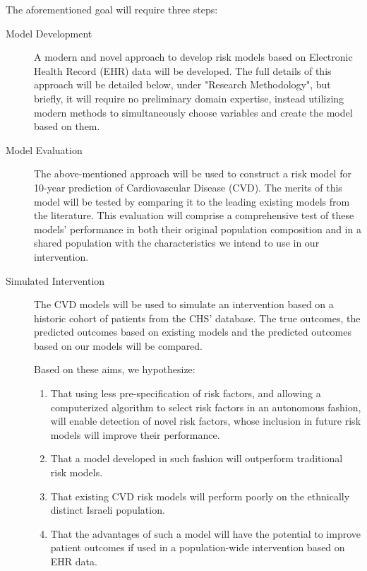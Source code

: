\documentclass[a4paper,12pt]{article}
\begin{document}
	The aforementioned goal will require three steps:
	\begin{description}
		
		\item[Model Development] A modern and novel approach to develop risk models based on Electronic Health Record (EHR) data will be developed. The full details of this approach will be detailed below, under "Research Methodology", but briefly, it will require no preliminary domain expertise, instead utilizing modern methods to simultaneously choose variables and create the model based on them.
		
		\item[Model Evaluation] The above-mentioned approach will be used to construct a risk model for 10-year prediction of Cardiovascular Disease (CVD). The merits of this model will be tested by comparing it to the leading existing models from the literature. This evaluation will comprise a comprehensive test of these models' performance in both their original population composition and in a shared population with the characteristics we intend to use in our intervention.
		
		\item[Simulated Intervention] The CVD models will be used to simulate an intervention based on a historic cohort of patients from the CHS' database. The true outcomes, the predicted outcomes based on existing models and the predicted outcomes based on our models will be compared.
		
		Based on these aims, we hypothesize:
		\begin{enumerate}
			
			\item That using less pre-specification of risk factors, and allowing a computerized algorithm to select risk factors in an autonomous fashion, will enable detection of novel risk factors, whose inclusion in future risk models will improve their performance.
			
			\item That a model developed in such fashion will outperform traditional risk models.
			
			\item That existing CVD risk models will perform poorly on the ethnically distinct Israeli population.
			
			\item That the advantages of such a model will have the potential to improve patient outcomes if used in a population-wide intervention based on EHR data.
			
		\end{enumerate}
		
	\end{description}
	
\end{document}
